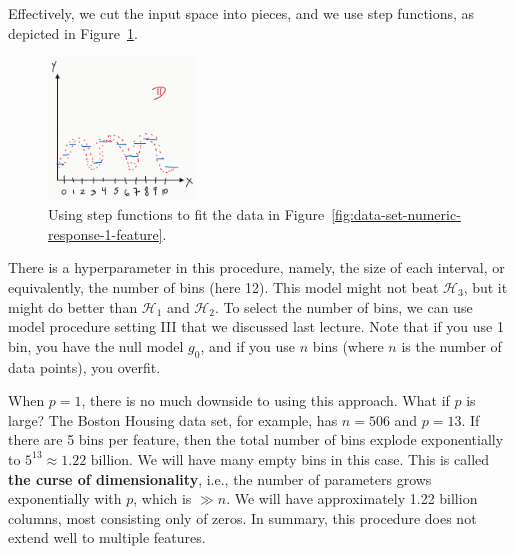 \documentclass[12pt, a4paper]{article}
\theoremstyle{definition}
\begin{document}
	Effectively, we cut the input space into pieces, and we use step functions,
	as depicted in Figure~\ref{fig:data-set-numeric-response-1-feature-step}.
	\begin{figure}
		\centering
		\includegraphics[width=0.35\textwidth]{data-set-numeric-response-1-feature-step}
		\caption{Using step functions to fit the data in
		Figure~\ref{fig:data-set-numeric-response-1-feature}.}
		\label{fig:data-set-numeric-response-1-feature-step}
	\end{figure}
	There is a hyperparameter in this procedure, namely, the size of each interval,
	or equivalently, the number of bins (here 12). This model might not beat
	$\mathcal{H}_3$, but it might do better than $\mathcal{H}_1$ and $\mathcal{H}_2$.
	To select the number of bins, we can use model procedure setting III that we discussed
	last lecture. Note that if you use 1 bin, you have the null model $g_0$,
	and if you use $n$ bins (where $n$ is the number of data points), you overfit.
	
	When $p = 1$, there is no much downside to using this approach. What if $p$ is large?
	The Boston Housing data set, for example, has $n = 506$ and $p = 13$. If there
	are 5 bins per feature, then the total number of bins explode exponentially
	to $5^{13}\approx 1.22 \text{ billion}$. We will have many empty bins in this
	case. This is called \textbf{the curse of dimensionality}, i.e., the number
	of parameters grows exponentially with $p$, which is $\gg n$. We will have
	approximately 1.22 billion columns, most consisting only of zeros. In summary,
	this procedure does not extend well to multiple features.
	
\end{document}
